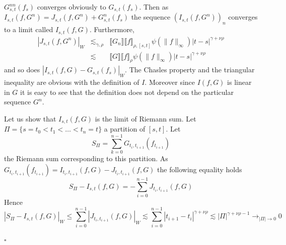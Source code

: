 \documentclass[a4paper,11pt]{article}
\newenvironment{proof}{{\sc Proof.}}{\hfill$\square$}
\begin{document}
\begin{proof}
  $G_{s,t}^{nn} (f_{s} )$ converges obviously to $G_{s,t} (f_{s} )$. Then as
  $I_{s,t} (f,G^{n} ) =J_{s,t} (f,G^{n} ) +G_{s,t}^{n} (f_{s} )$ the sequence
  $( I_{s,t} (f,G^{n} ) )_{n}$ converges to a limit called $I_{s,t} (f,G)$.
  Furthermore,
  \begin{eqnarray*}
    |J_{s,t} (f,G^{n} )|_{W} & \lesssim_{\gamma , \rho} & \llbracket G_{n}
    \rrbracket \llbracket f \rrbracket_{\rho , [s,t]} \psi ( \|f\|_{\infty} )
    |t-s|^{\gamma + \nu \rho}\\
    & \lesssim & \llbracket G \rrbracket \llbracket f \rrbracket_{\rho} \psi
    ( \|f\|_{\infty} ) |t-s|^{\gamma + \nu \rho}
  \end{eqnarray*}
  and so does $|I_{s,t} (f,G)-G_{s,t} (f_{s} )|_{W}$. The Chasles property and
  the triangular inequality are obvious with the definition of $I$. Moreover
  since $I (f,G)$ is linear in $G$ it is easy to see that the definition does
  not depend on the particular sequence $G^{n}$.
  
  Let us show that $I_{s,t} (f,G)$ is the limit of Riemann sum. Let $\Pi =
  \{s=t_{0} <t_{1} < \ldots <t_{n} =t\}$ a partition of $[s,t]$. Let
  \[ S_{\Pi} = \sum_{k=0}^{n-1} G_{t_{i} ,t_{i+1}} (f_{t_{i+1}} ) \]
  the Riemann sum corresponding to this partition. As $G_{t_{i} ,t_{i+1}}
  (f_{t_{i+1}} ) =I_{t_{i} ,t_{i+1}} (f,G) -J_{t_{i} ,t_{i+1}} (f,G)$ the
  following equality holds
  \[ S_{\Pi} -I_{s,t} (f,G) =- \sum_{i=0}^{n-1} J_{t_{i} ,t_{i+1}} (f,G) \]
  Hence
  \begin{equation*}
    |S_{\Pi} -I_{s,t} (f,G)|_{W}  \leqslant  \sum_{i=0}^{n-1} |J_{t_{i}
    ,t_{i+1}} (f,G)|_{W}
    \lesssim   \sum_{i=0}^{n-1} |t_{i+1} -t_{i} |^{\gamma + \nu \rho}
     \lesssim  | \Pi |^{\gamma + \nu \rho -1} \to_{| \Pi | \to 0} 0
  \end{equation*}
  

\end{proof}
\end{document}
